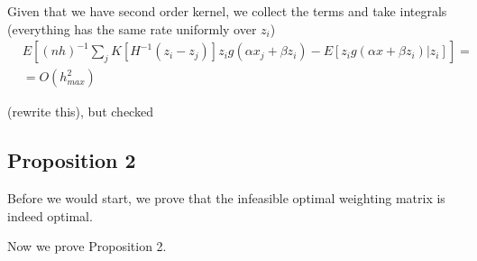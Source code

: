 \documentclass{article}
\theoremstyle{definition}
\theoremstyle{remark}
\begin{document}
Given that we have  second order kernel, we collect the terms and take integrals (everything has the same rate uniformly over $z_i$)
\begin{align}
&E[(nh)^{-1}\sum_j K[H^{-1}(z_i-z_j)] z_i g(\alpha x_j + \beta z_i)-E[z_i g(\alpha x + \beta z_i)|z_i]]= \\
&=O(h_{max}^2) \nonumber
\end{align}

{\color{red} (rewrite this), but checked}

\subsection{Proposition 2}
Before we would start, we prove that the infeasible optimal weighting matrix is indeed optimal.


Now we prove Proposition 2.
\end{document}
